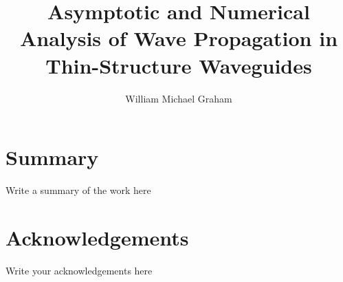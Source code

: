 \documentclass[a4paper]{report}
\title{Asymptotic and Numerical Analysis of Wave Propagation in Thin-Structure Waveguides}
\author{William Michael Graham}
\begin{document}
\maketitle


\License

\chapter*{Summary}
Write a summary of the work here

\chapter*{Acknowledgements}
Write your acknowledgements here

\tableofcontents

\cleardoublepage %
\listoffigures %

\cleardoublepage
{}











\newpage


\end{document}
